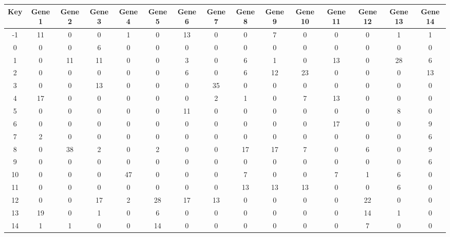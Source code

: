 \begin{tabular}{|c|c|c|c|c|c|c|c|c|c|c|c|c|c|c|}
\hline
Key & Gene 1 & Gene 2 & Gene 3 & Gene 4 & Gene 5 & Gene 6 & Gene 7 & Gene 8 & Gene 9 & Gene 10 & Gene 11 & Gene 12 & Gene 13 & Gene 14 \\
\hline
-1 & 11 & 0 & 0 & 1 & 0 & 13 & 0 & 0 & 7 & 0 & 0 & 0 & 1 & 1 \\
0 & 0 & 0 & 6 & 0 & 0 & 0 & 0 & 0 & 0 & 0 & 0 & 0 & 0 & 0 \\
1 & 0 & 11 & 11 & 0 & 0 & 3 & 0 & 6 & 1 & 0 & 13 & 0 & 28 & 6 \\
2 & 0 & 0 & 0 & 0 & 0 & 6 & 0 & 6 & 12 & 23 & 0 & 0 & 0 & 13 \\
3 & 0 & 0 & 13 & 0 & 0 & 0 & 35 & 0 & 0 & 0 & 0 & 0 & 0 & 0 \\
4 & 17 & 0 & 0 & 0 & 0 & 0 & 2 & 1 & 0 & 7 & 13 & 0 & 0 & 0 \\
5 & 0 & 0 & 0 & 0 & 0 & 11 & 0 & 0 & 0 & 0 & 0 & 0 & 8 & 0 \\
6 & 0 & 0 & 0 & 0 & 0 & 0 & 0 & 0 & 0 & 0 & 17 & 0 & 0 & 9 \\
7 & 2 & 0 & 0 & 0 & 0 & 0 & 0 & 0 & 0 & 0 & 0 & 0 & 0 & 6 \\
8 & 0 & 38 & 2 & 0 & 2 & 0 & 0 & 17 & 17 & 7 & 0 & 6 & 0 & 9 \\
9 & 0 & 0 & 0 & 0 & 0 & 0 & 0 & 0 & 0 & 0 & 0 & 0 & 0 & 6 \\
10 & 0 & 0 & 0 & 47 & 0 & 0 & 0 & 7 & 0 & 0 & 7 & 1 & 6 & 0 \\
11 & 0 & 0 & 0 & 0 & 0 & 0 & 0 & 13 & 13 & 13 & 0 & 0 & 6 & 0 \\
12 & 0 & 0 & 17 & 2 & 28 & 17 & 13 & 0 & 0 & 0 & 0 & 22 & 0 & 0 \\
13 & 19 & 0 & 1 & 0 & 6 & 0 & 0 & 0 & 0 & 0 & 0 & 14 & 1 & 0 \\
14 & 1 & 1 & 0 & 0 & 14 & 0 & 0 & 0 & 0 & 0 & 0 & 7 & 0 & 0 \\
\hline
\end{tabular}